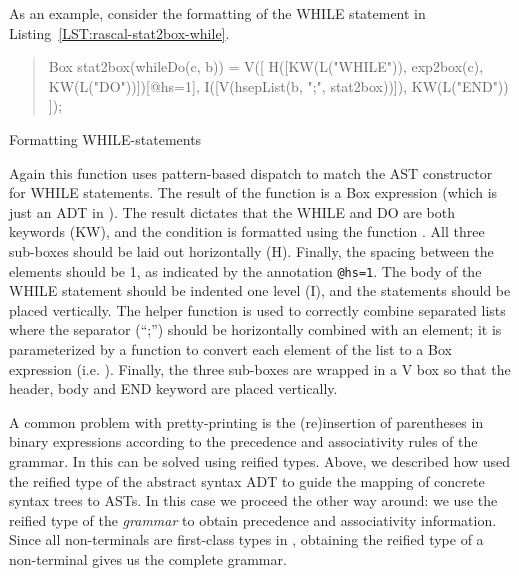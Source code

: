 As an example, consider the formatting of the WHILE statement in Listing~\ref{LST:rascal-stat2box-while}.
\begin{listing}
\begin{quote}
\begin{rascal}
Box stat2box(whileDo(c, b)) = V([
   H([KW(L("WHILE")), exp2box(c), KW(L("DO"))])[@hs=1],
      I([V(hsepList(b, ";", stat2box))]),
   KW(L("END"))
]);  
\end{rascal} 
\end{quote}
\caption{Formatting WHILE-statements}
\label{LST:rascal-stat2box-while}
\end{listing}
Again this function uses pattern-based dispatch to match the AST
constructor for WHILE statements. The result of the function is a Box
expression (which is just an ADT in \Rascal). The result dictates that
the WHILE and DO are both keywords (KW), and the condition 
is formatted using the function . All three sub-boxes
should be laid out horizontally (H). Finally, the spacing between the
elements should be 1, as indicated by the annotation \texttt{@hs=1}.
The body  of the WHILE statement should be indented one
level (I), and the statements should be placed vertically. The helper
function  is used to correctly combine separated
lists where the separator (``;'') should be horizontally combined with
an element; it is parameterized by a function to convert each
element of the list to a Box expression (i.e. ).
Finally, the three sub-boxes are wrapped in a V box so that the
header, body and END keyword are placed vertically.

A common problem with pretty-printing is the (re)insertion of
parentheses in binary expressions according to the precedence and
associativity rules of the grammar. In \Rascal this can be solved
using reified types. Above, we described how  used
the reified type of the abstract syntax ADT to guide the mapping of
concrete syntax trees to ASTs. In this case we proceed the other way around: we
use the reified type of the \textit{grammar} to obtain precedence and
associativity information. Since all non-terminals are first-class
types in \Rascal, obtaining the reified type of a non-terminal gives
us the complete grammar. 


